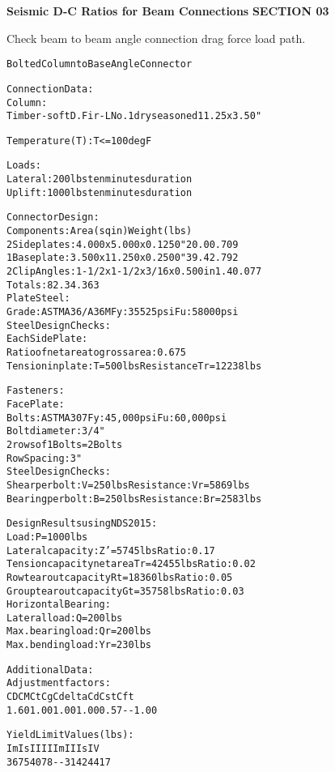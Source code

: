 \documentclass[12pt,notitle,letterpaper]{report}
\renewenvironment{quote}
  {\small\list{}{\rightmargin=0cm \leftmargin=0cm}%
   \item\relax}
  {\endlist}
\begin{document}
\vspace{.2in}   \textbf{Seismic D-C Ratios for Beam Connections}   \hfill\textbf{SECTION 03}
\newline   \vspace{.05in}   {\color{black}\hrulefill}

Check beam to beam angle connection drag force load path.


\begin{quote}
\begin{alltt}
Bolted Column to Base Angle Connector

 Connection Data:
    Column:
       Timber-soft  D.Fir-L No.1  dry seasoned 11.25 x 3.50"

    Temperature (T) : T <= 100 deg F

    Loads:
       Lateral:     200 lbs   ten minutes duration
       Uplift:     1000 lbs   ten minutes duration

 Connector Design:
    Components:                                    Area (sq in)  Weight (lbs)
       2 Side plates:  4.000 x  5.000 x  0.1250"       20.0        0.709
       1 Base plate:   3.500 x 11.250 x  0.2500"       39.4        2.792
       2 Clip Angles: 1-1/2 x 1-1/2 x 3/16 x 0.500 in   1.4        0.077
       Totals:                                         82.3        4.363
       Plate Steel:
          Grade: ASTM A36/A36M       Fy:  35525 psi    Fu:  58000 psi
       Steel Design Checks:
          Each Side Plate:
             Ratio of net area to gross area: 0.675
             Tension in plate: T =   500 lbs   Resistance Tr = 12238 lbs

    Fasteners:
       Face Plate:
          Bolts: ASTM A307     Fy: 45,000 psi     Fu: 60,000 psi
          Bolt diameter: 3/4"
          2 rows of 1 Bolts =  2 Bolts
          Row Spacing:          3"
          Steel Design Checks:
             Shear per bolt:   V =   250 lbs   Resistance:    Vr =  5869 lbs
             Bearing per bolt: B =   250 lbs   Resistance:    Br =  2583 lbs

 Design Results using NDS 2015:
    Load:                     P  =  1000 lbs
    Lateral capacity:         Z' =  5745 lbs  Ratio: 0.17
    Tension capacity net area Tr = 42455 lbs  Ratio: 0.02
    Row tear out capacity     Rt = 18360 lbs  Ratio: 0.05
    Group tear out capacity   Gt = 35758 lbs  Ratio: 0.03
    Horizontal Bearing:
       Lateral load:             Q  =   200 lbs
       Max. bearing load:        Qr =   200 lbs
       Max. bending load:        Yr =   230 lbs

 Additional Data:
    Adjustment factors:
    CD     CM     Ct     Cg   Cdelta   Cd    Cst    Cft
    1.60   1.00   1.00   1.00   0.57    -      -     1.00

    Yield Limit Values (lbs):
       Im        Is        II        IIIm      IIIs      IV
       3675      4078      -          -        3142      4417
\end{alltt}
\end{quote}
\end{document}
